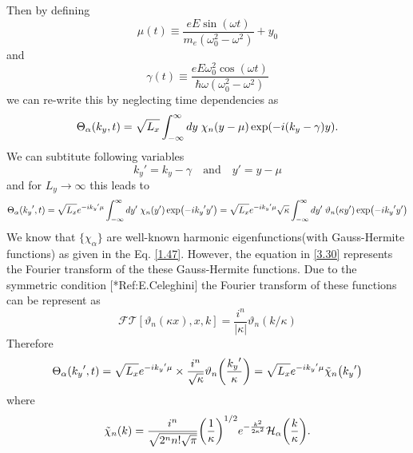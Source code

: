 Then by defining
\begin{equation} \label{3.26}
  \mu(t) \equiv \frac{eE\sin(\omega t)}{m_e(\omega_0^2 - \omega^2)} + y_0
\end{equation}
and
\begin{equation} \label{3.27}
  \gamma(t) \equiv
  \frac{eE\omega_0^2\cos(\omega t)}{\hbar\omega(\omega_0^2 - \omega^2)}
\end{equation}
we can re-write this by neglecting time dependencies as
\begin{equation} \label{3.28}
  \Theta_{\alpha}(k_y,t) =
  \sqrt{L_x}
  \int_{-\infty}^{\infty} dy\;
  \chi_{n}\qty(y - \mu )
  \exp(
    -i\qty(k_y - \gamma)
    y).
\end{equation}
We can subtitute following variables
\begin{equation} \label{3.29}
  {k_y}' = k_y -\gamma \quad \text{and} \quad y' = y -\mu
\end{equation}
and for $L_y \rightarrow \infty$ this leads to
\begin{equation} \label{3.30}
  \Theta_{\alpha}({k_y}' ,t) =
  {\sqrt{L_x}} e^{-i {k_y}'\mu}
  \int_{-\infty}^{\infty} dy'\;
  \chi_{n}\qty(y')
  \exp(-i{k_y}' y')
  =
  {\sqrt{L_x}} e^{-i {k_y}'\mu}
  \sqrt{\kappa}
  \int_{-\infty}^{\infty} dy'\;
  \vartheta_n \qty(\kappa y')
  \exp(-i{k_y}' y')
\end{equation}
We know that $\{\chi_{\alpha}\}$ are well-known harmonic eigenfunctions(with Gauss-Hermite functions) as given in the Eq. \eqref{1.47}. However, the equation in \eqref{3.30} represents the Fourier transform of the these Gauss-Hermite functions. Due to the symmetric condition [*Ref:E.Celeghini] the Fourier transform of these functions can be represent as
\begin{equation} \label{3.31}
  \mathcal{FT}[\vartheta_n(\kappa x),x,k] = \frac{i^n}{|\kappa|}\vartheta_n(k/\kappa)
\end{equation}
Therefore
\begin{equation} \label{3.32}
  \Theta_{\alpha}({k_y}' ,t) =
  \sqrt{L_x}e^{-i {k_y}'\mu} \times \frac{i^n}{\sqrt{\kappa}} \vartheta_n \qty(\frac{{k_y}'}{\kappa}) =
    \sqrt{L_x}e^{-i {k_y}'\mu}
    \tilde{\chi}_{n}\qty({k_y}')
\end{equation}
where
\begin{equation} \label{3.33}
  \tilde{\chi}_{n}\qty(k) =
  \frac{i^n}{\sqrt{2^{n} n! \sqrt{\pi}}}
  \qty(\frac{1}{\kappa})^{1/2}
  e^{-\frac{k^2}{2 \kappa^2}}
  \mathcal{H}_{\alpha} \qty(\frac{k}{\kappa}).
\end{equation}
